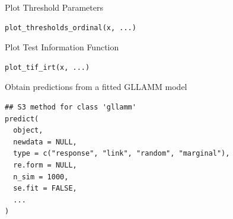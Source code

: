 \documentclass[a4paper]{book}
\begin{document}
%
\begin{Description}
Plot Threshold Parameters
\end{Description}
%
\begin{Usage}
\begin{verbatim}
plot_thresholds_ordinal(x, ...)
\end{verbatim}
\end{Usage}
%
\begin{Description}
Plot Test Information Function
\end{Description}
%
\begin{Usage}
\begin{verbatim}
plot_tif_irt(x, ...)
\end{verbatim}
\end{Usage}
%
\begin{Description}
Obtain predictions from a fitted GLLAMM model
\end{Description}
%
\begin{Usage}
\begin{verbatim}
## S3 method for class 'gllamm'
predict(
  object,
  newdata = NULL,
  type = c("response", "link", "random", "marginal"),
  re.form = NULL,
  n_sim = 1000,
  se.fit = FALSE,
  ...
)
\end{verbatim}
\end{Usage}
%
\end{document}
